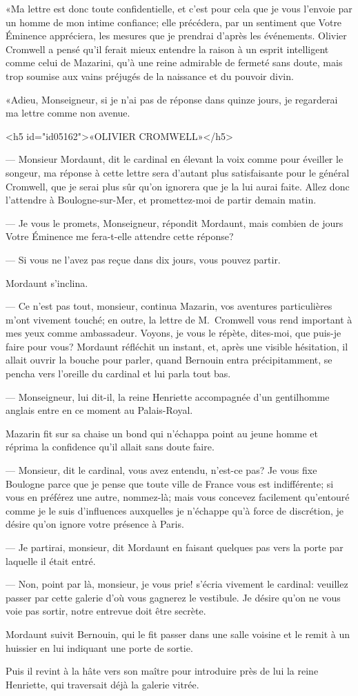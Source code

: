 «Ma lettre est donc toute confidentielle, et c'est pour cela que je vous l'envoie par un homme de mon intime confiance; elle précédera, par un sentiment que Votre Éminence appréciera, les mesures que je prendrai d'après les événements. Olivier Cromwell a pensé qu'il ferait mieux entendre la raison à un esprit intelligent comme celui de Mazarini, qu'à une reine admirable de fermeté sans doute, mais trop soumise aux vains préjugés de la naissance et du pouvoir divin.

«Adieu, Monseigneur, si je n'ai pas de réponse dans quinze jours, je regarderai ma lettre comme non avenue.

<h5 id="id05162">«OLIVIER CROMWELL»</h5>

— Monsieur Mordaunt, dit le cardinal en élevant la voix comme pour éveiller le songeur, ma réponse à cette lettre sera d'autant plus satisfaisante pour le général Cromwell, que je serai plus sûr qu'on ignorera que je la lui aurai faite. Allez donc l'attendre à Boulogne-sur-Mer, et promettez-moi de partir demain matin.

— Je vous le promets, Monseigneur, répondit Mordaunt, mais combien de jours Votre Éminence me fera-t-elle attendre cette réponse?

— Si vous ne l'avez pas reçue dans dix jours, vous pouvez partir.

Mordaunt s'inclina.

— Ce n'est pas tout, monsieur, continua Mazarin, vos aventures particulières m'ont vivement touché; en outre, la lettre de
M.~Cromwell vous rend important à mes yeux comme ambassadeur. Voyons, je vous le répète, dites-moi, que puis-je faire pour vous?
Mordaunt réfléchit un instant, et, après une visible hésitation, il allait ouvrir la bouche pour parler, quand Bernouin entra précipitamment, se pencha vers l'oreille du cardinal et lui parla tout bas.

— Monseigneur, lui dit-il, la reine Henriette accompagnée d'un gentilhomme anglais entre en ce moment au Palais-Royal.

Mazarin fit sur sa chaise un bond qui n'échappa point au jeune homme et réprima la confidence qu'il allait sans doute faire.

— Monsieur, dit le cardinal, vous avez entendu, n'est-ce pas? Je vous fixe Boulogne parce que je pense que toute ville de France vous est indifférente; si vous en préférez une autre, nommez-là; mais vous concevez facilement qu'entouré comme je le suis d'influences auxquelles je n'échappe qu'à force de discrétion, je désire qu'on ignore votre présence à Paris.

— Je partirai, monsieur, dit Mordaunt en faisant quelques pas vers la porte par laquelle il était entré.

— Non, point par là, monsieur, je vous prie! s'écria vivement le cardinal: veuillez passer par cette galerie d'où vous gagnerez le vestibule. Je désire qu'on ne vous voie pas sortir, notre entrevue doit être secrète.

Mordaunt suivit Bernouin, qui le fit passer dans une salle voisine et le remit à un huissier en lui indiquant une porte de sortie.

Puis il revint à la hâte vers son maître pour introduire près de lui la reine Henriette, qui traversait déjà la galerie vitrée.